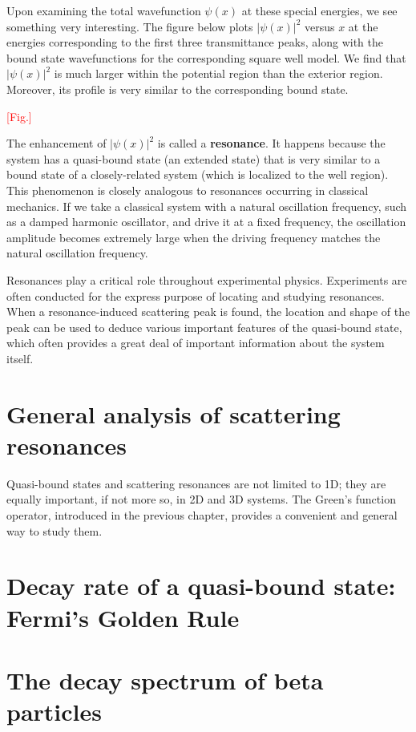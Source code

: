 \documentclass[pra,12pt]{revtex4}
\begin{document}
Upon examining the total wavefunction $\psi(x)$ at these special
energies, we see something very interesting.  The figure below plots
$|\psi(x)|^2$ versus $x$ at the energies corresponding to the first
three transmittance peaks, along with the bound state wavefunctions
for the corresponding square well model.  We find that $|\psi(x)|^2$
is much larger within the potential region than the exterior region.
Moreover, its profile is very similar to the corresponding bound
state.

\textcolor{red}{[Fig.]}

The enhancement of $|\psi(x)|^2$ is called a \textbf{resonance}.  It
happens because the system has a quasi-bound state (an extended state)
that is very similar to a bound state of a closely-related system
(which is localized to the well region).  This phenomenon is closely
analogous to resonances occurring in classical mechanics.  If we take
a classical system with a natural oscillation frequency, such as a
damped harmonic oscillator, and drive it at a fixed frequency, the
oscillation amplitude becomes extremely large when the driving
frequency matches the natural oscillation frequency.

Resonances play a critical role throughout experimental physics.
Experiments are often conducted for the express purpose of locating
and studying resonances.  When a resonance-induced scattering peak is
found, the location and shape of the peak can be used to deduce
various important features of the quasi-bound state, which often
provides a great deal of important information about the system
itself.

\section{General analysis of scattering resonances}

Quasi-bound states and scattering resonances are not limited to 1D;
they are equally important, if not more so, in 2D and 3D systems.  The
Green's function operator, introduced in the previous chapter,
provides a convenient and general way to study them.



\section{Decay rate of a quasi-bound state: Fermi's Golden Rule}

\section{The decay spectrum of beta particles}
\end{document}
